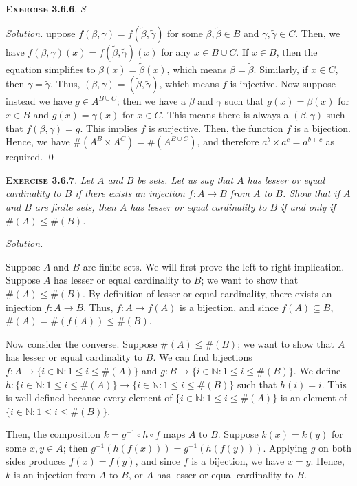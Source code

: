 \documentclass[12pt]{article}
\theoremstyle{remark}
\newenvironment{exer}[2]{
    \noindent \setlength{\parskip}{1em}%
    \textsc{\textbf{Exercise #1}}. \textit{#2} \par
    \noindent \textit{Solution.} %
}{\bigskip}
\begin{document}
\begin{exer}{3.6.6}
    Suppose $f(\beta, \gamma) = f(\tilde{\beta}, \tilde{\gamma})$ for some $\beta, \tilde{\beta} \in B$ and $\gamma, \tilde{\gamma} \in C$.
    Then, we have $f(\beta, \gamma)(x) = f(\tilde{\beta}, \tilde{\gamma})(x)$ for any $x \in B \cup C$.
    If $x \in B$, then the equation simplifies to $\beta(x) = \tilde{\beta}(x)$, which means $\beta = \tilde{\beta}$.
    Similarly, if $x \in C$, then $\gamma = \tilde{\gamma}$.
    Thus, $(\beta, \gamma) = (\tilde{\beta}, \tilde{\gamma})$, which means $f$ is injective.
    Now suppose instead we have $g \in A^{B \cup C}$; then we have a $\beta$ and $\gamma$ such that $g(x) = \beta(x)$ for $x \in B$ and $g(x) = \gamma(x)$ for $x \in C$.
    This means there is always a $(\beta, \gamma)$ such that $f(\beta, \gamma) = g$.
    This implies $f$ is surjective.    
    Then, the function $f$ is a bijection.
    Hence, we have $\#(A^B \times A^C) = \#(A^{B \cup C})$, and therefore $a^b \times a^c = a^{b+c}$ as required. \qed
\end{exer}


\begin{exer}{3.6.7}{
    Let $A$ and $B$ be sets.
    Let us say that $A$ has \emph{lesser or equal} cardinality to $B$ if there exists an injection $f : A \to B$ from $A$ to $B$.
    Show that if $A$ and $B$ are finite sets, then $A$ has lesser or equal cardinality to $B$ if and only if $\#(A) \le \#(B)$.
}
    Suppose $A$ and $B$ are finite sets.
    We will first prove the left-to-right implication.
    Suppose $A$ has lesser or equal cardinality to $B$; we want to show that $\#(A) \le \#(B)$.
    By definition of lesser or equal cardinality, there exists an injection $f : A \to B$.
    Thus, $f : A \to f(A)$ is a bijection, and since $f(A) \subseteq B$, $\#(A) = \#(f(A)) \le \#(B)$.

    Now consider the converse.
    Suppose $\#(A) \le \#(B)$; we want to show that $A$ has lesser or equal cardinality to $B$.
    We can find bijections $f : A \to \{ i \in \mathbb{N} : 1 \le i \le \#(A) \}$ and $g : B \to \{ i \in \mathbb{N} : 1 \le i \le \#(B) \}$.
    We define $h : \{ i \in \mathbb{N} : 1 \le i \le \#(A) \} \to \{ i \in \mathbb{N} : 1 \le i \le \#(B) \}$ such that $h(i) = i$.
    This is well-defined because every element of $\{ i \in \mathbb{N} : 1 \le i \le \#(A) \}$ is an element of $\{ i \in \mathbb{N} : 1 \le i \le \#(B) \}$.
    
    Then, the composition $k = g^{-1} \circ h \circ f$ maps $A$ to $B$.
    Suppose $k(x) = k(y)$ for some $x, y \in A$; then $g^{-1}(h(f(x))) = g^{-1}(h(f(y)))$.
    Applying $g$ on both sides produces $f(x) = f(y)$, and since $f$ is a bijection, we have $x = y$.
    Hence, $k$ is an injection from $A$ to $B$, or $A$ has lesser or equal cardinality to $B$.
\end{exer}
\end{document}
